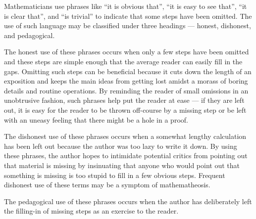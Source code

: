 \documentclass[12pt]{article}
\begin{document}


Mathematicians use phrases like ``it is obvious that'', ``it is easy to see that'', ``it is clear that'', and ``is trivial'' to indicate that some steps have been omitted.  The use of such language may be classified under three headings --- honest, dishonest, and pedagogical.

The honest use of these phrases occurs when only a few steps have been omitted and these steps are simple enough that the average reader can easily fill in the gaps.  Omitting such steps can be beneficial because it cuts down the length of an exposition and keeps the main ideas from getting lost amidst a morass of boring details and routine operations.  By reminding the reader of small omissions in an unobtrusive fashion, such phrases help put the reader at ease --- if they are left out, it is easy for the reader to be thrown off-course by a missing step or be left with an uneasy feeling that there might be a hole in a proof.

The dishonest use of these phrases occurs when a somewhat lengthy calculation has been left out because the author was too lazy to write it down.  By using these phrases, the author hopes to intimidate potential critics from pointing out that material is missing by insinuating that anyone who would point out that something is missing is too stupid to fill in a few obvious steps.  Frequent dishonest use of these terms may be a symptom of mathematheosis.

The pedagogical use of these phrases occurs when the author has deliberately left the filling-in of missing steps as an exercise to the reader.
\end{document}
